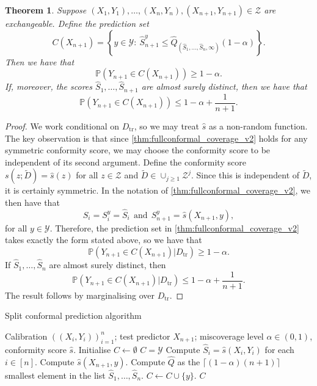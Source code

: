 \documentclass[11pt, titlepage]{article} %
\newcommand{\Prob}[1]{\mathbb{P}\left( #1 \right)}
\numberwithin{equation}{section}
\newtheorem{theorem}{Theorem}
\theoremstyle{definition}
\numberwithin{theorem}{section}
\numberwithin{lemma}{section}
\numberwithin{corollary}{section}
\numberwithin{proposition}{section}
\numberwithin{definition}{section}
\numberwithin{remark}{section}
\begin{document}
\begin{theorem}
    Suppose \((X_1, Y_1), \ldots, (X_n, Y_n), (X_{n+1}, Y_{n+1}) \in \mathcal{Z}\) are exchangeable. Define the prediction set \begin{equation}
        C(X_{n+1}) = \left\{ y \in \mathcal{Y}: \  \hat{S}_{n+1}^y \leq \hat{Q}_{(\hat{S}_1, \ldots, \hat{S}_n, \infty)}(1-\alpha)  \right\}.
    \label{eqn:splitconformal_prediction_set}
    \end{equation} Then we have that \[\Prob{Y_{n+1} \in C(X_{n+1})} \geq 1-\alpha.\] If, moreover, the scores \(\hat{S}_1, \ldots, \hat{S}_{n+1}\) are almost surely distinct, then we have that \[\Prob{Y_{n+1} \in C(X_{n+1})} \leq 1-\alpha + \frac{1}{n+1}.\]
\label{thm:splitconformal_coverage}
\end{theorem}
\begin{proof}
    We work conditional on \(D_\mathrm{tr}\), so we may treat \(\hat{s}\) as a non-random function. The key observation is that since \cref{thm:fullconformal_coverage_v2} holds for any symmetric conformity score, we may choose the conformity score to be independent of its second argument. Define the conformity score \(s(z; \tilde{D}) = \hat{s}(z)\) for all \(z \in \mathcal{Z}\) and \(\tilde{D} \in \cup_{j \geq 1} \mathcal{Z}^j\). Since this is independent of \(\tilde{D}\), it is certainly symmetric. In the notation of \cref{thm:fullconformal_coverage_v2}, we then have that \[S_i = S_i^y = \hat{S}_i \ \ \mathrm{and} \ \ S_{n+1}^y = \hat{s}(X_{n+1}, y),\] for all \(y \in \mathcal{Y}\). Therefore, the prediction set in \cref{thm:fullconformal_coverage_v2} takes exactly the form stated above, so we have that \[\Prob{Y_{n+1} \in C(X_{n+1}) | D_{\mathrm{tr}}  } \geq 1-\alpha.\] If \(\hat{S}_1, \ldots, \hat{S}_n\) are almost surely distinct, then \[\Prob{Y_{n+1} \in C(X_{n+1}) | D_{\mathrm{tr}}  } \leq 1-\alpha + \frac{1}{n+1}.\] The result follows by marginalising over \(D_\mathrm{tr}.\)
\end{proof}

\begin{algorithm}[H]
\label{alg:split_conformal}
\caption{Split conformal prediction algorithm}
\begin{algorithmic}
    \Require Calibration \(((X_i, Y_i))_{i=1}^n\); test predictor \(X_{n+1}\); miscoverage level \(\alpha \in (0,1)\), conformity score \(\hat{s}\).
    \State Initialise \(C \gets \emptyset\)
        \State \(C = \mathcal{Y}\)
    \Else
        \State Compute \(\hat{S}_i = \hat{s}(X_i,Y_i)\) for each \(i \in [n]\).
            \State Compute \(\hat{s}(X_{n+1}, y)\).
            \State Compute \(\hat{Q}\) as the \(\lceil (1-\alpha)(n+1) \rceil \) smallest element in the list \(\hat{S}_1, \ldots, \hat{S}_n\).
                \State \(C \gets C \cup \{y\} \).
            \EndIf   
        \EndFor
    \EndIf
    \Ensure \(C\)
\end{algorithmic}
\end{algorithm}
\end{document}
